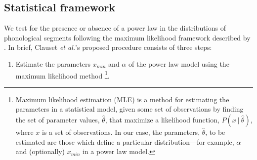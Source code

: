 \hypertarget{method}{%
\subsection{Statistical framework}\label{method}}

We test for the presence or absence of a power law in the distributions of phonological segments following the maximum likelihood framework described by \textcite{clauset_power-law_2009}. In brief, Clauset \emph{et al.}'s \autocite*[p.~663]{clauset_power-law_2009} proposed procedure consists of three steps:

\begin{enumerate}
\def\labelenumi{\arabic{enumi}.}
\tightlist
\item
  Estimate the parameters \(x_{min}\) and \(\alpha\) of the power law model using the maximum likelihood method \autocites{barndorff-nielsen_inference_1994}{newman_power_2005}\footnote{Maximum likelihood estimation (MLE) is a method for estimating the parameters in a statistical model, given some set of observations by finding the set of parameter values, \(\hat{\theta}\), that maximize a likelihood function, \(P(x\ |\ \hat{\theta})\), where \(x\) is a set of observations. In our case, the parameters, \(\hat{\theta}\), to be estimated are those which define a particular distribution---for example, \(\alpha\) and (optionally) \(x_{min}\) in a power law model.}.
\end{enumerate}

